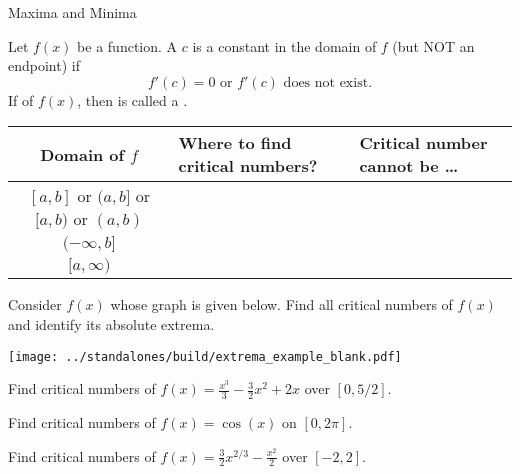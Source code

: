 \documentclass[../main.tex]{subfiles}
\begin{document}
\begin{lesson}{Maxima and Minima}
  \begin{mdframed}[style=withref-compact]
    Let \(f(x)\) be a function. A  \(c\) is a constant in the domain of \(f\) (but NOT an endpoint) if 
    \[
      f'(c) = 0 \text{ or } f'(c) \text{ does not exist}.
    \]
    If  of \(f(x)\), then  is called a .

  \end{mdframed}

  \begin{center}
    \begin{tabular}{c|l|l}
      Domain of \(f\) & Where to find critical numbers? & Critical number cannot be \ldots{} \\\midrule
      \([a,b]\) or \((a,b]\) or \([a,b)\) or \((a,b)\) & & \\[1ex]\midrule
      \((-\infty, b]\) & & \\[1ex]\midrule
      \([a, \infty)\) & & \\[1ex]\midrule
    \end{tabular}
  \end{center}
  
  \begin{example} \label{ex:critical-numbers}
    Consider \(f(x)\) whose graph is given below. Find all critical numbers of \(f(x)\) and identify its absolute extrema.

    \begin{center}
      \texttt{[image: ../standalones/build/extrema\_example\_blank.pdf]}
    \end{center}
  \end{example}
  \clearpage

  \begin{example} \label{ex:critical-number-polynomial}
    Find critical numbers of \(f(x) = \frac{x^{3}}{3} - \frac{3}{2}x^{2} + 2x\) over \([0, 5/2]\).
  \end{example}

  \begin{example} \label{ex:critical-number-trig}
    Find critical numbers of \(f(x) = \cos(x)\) on \([0, 2\pi]\).

  \end{example}

  \begin{example} \label{ex:critical-number-rational}
    Find critical numbers of \(f(x) = \frac{3}{2} x^{2/3} - \frac{x^{2}}{2}\) over \([-2,2]\). 


\end{example}
\end{lesson}
\end{document}
